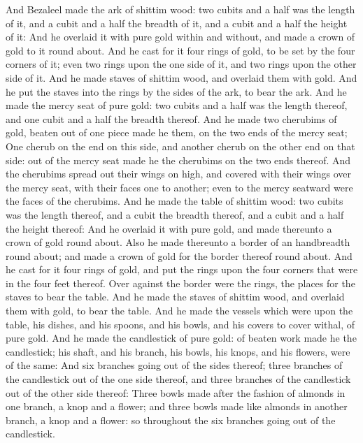 \begin{biblechapter} %
 And Bezaleel made the ark of shittim wood: two cubits and a half was the length of it, and a cubit and a half the breadth of it, and a cubit and a half the height of it:
\verse And he overlaid it with pure gold within and without, and made a crown of gold to it round about.
\verse And he cast for it four rings of gold, to be set by the four corners of it; even two rings upon the one side of it, and two rings upon the other side of it.
\verse And he made staves of shittim wood, and overlaid them with gold.
\verse And he put the staves into the rings by the sides of the ark, to bear the ark.
\verse And he made the mercy seat of pure gold: two cubits and a half was the length thereof, and one cubit and a half the breadth thereof.
\verse And he made two cherubims of gold, beaten out of one piece made he them, on the two ends of the mercy seat;
\verse One cherub on the end on this side, and another cherub on the other end on that side: out of the mercy seat made he the cherubims on the two ends thereof.
\verse And the cherubims spread out their wings on high, and covered with their wings over the mercy seat, with their faces one to another; even to the mercy seatward were the faces of the cherubims.
 And he made the table of shittim wood: two cubits was the length thereof, and a cubit the breadth thereof, and a cubit and a half the height thereof:
\verse And he overlaid it with pure gold, and made thereunto a crown of gold round about.
\verse Also he made thereunto a border of an handbreadth round about; and made a crown of gold for the border thereof round about.
\verse And he cast for it four rings of gold, and put the rings upon the four corners that were in the four feet thereof.
\verse Over against the border were the rings, the places for the staves to bear the table.
\verse And he made the staves of shittim wood, and overlaid them with gold, to bear the table.
\verse And he made the vessels which were upon the table, his dishes, and his spoons, and his bowls, and his covers to cover withal, of pure gold.
 And he made the candlestick of pure gold: of beaten work made he the candlestick; his shaft, and his branch, his bowls, his knops, and his flowers, were of the same:
\verse And six branches going out of the sides thereof; three branches of the candlestick out of the one side thereof, and three branches of the candlestick out of the other side thereof:
\verse Three bowls made after the fashion of almonds in one branch, a knop and a flower; and three bowls made like almonds in another branch, a knop and a flower: so throughout the six branches going out of the candlestick.

\end{biblechapter}
